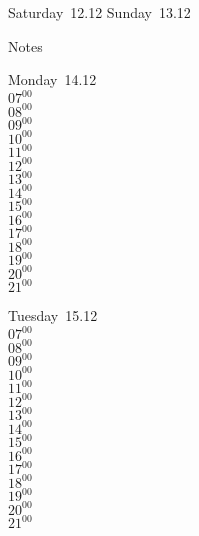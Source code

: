 \documentclass[11pt,a4paper]{book}\usepackage[]{graphicx}\usepackage[]{color}
\begin{document}
\begin{weekendbox}
  Saturday~12.12
  \tcblower
  Sunday~13.12
\end{weekendbox} %
\begin{notebox}
  Notes
\end{notebox}
\clearpage
\begin{headerbox}
\end{headerbox}
\begin{weekdaybox}
  Monday~14.12\\
  { 
  \vfill
  $07^{00}$\\
$08^{00}$\\
$09^{00}$\\
$10^{00}$\\
$11^{00}$\\
$12^{00}$\\
$13^{00}$\\
$14^{00}$\\
$15^{00}$\\
$16^{00}$\\
$17^{00}$\\
$18^{00}$\\
$19^{00}$\\
$20^{00}$\\
$21^{00}$\\
  }
\end{weekdaybox}
\begin{weekdaybox}
  Tuesday~15.12\\
  { 
  \vfill
  $07^{00}$\\
$08^{00}$\\
$09^{00}$\\
$10^{00}$\\
$11^{00}$\\
$12^{00}$\\
$13^{00}$\\
$14^{00}$\\
$15^{00}$\\
$16^{00}$\\
$17^{00}$\\
$18^{00}$\\
$19^{00}$\\
$20^{00}$\\
$21^{00}$\\
  }
\end{weekdaybox}
\end{document}
